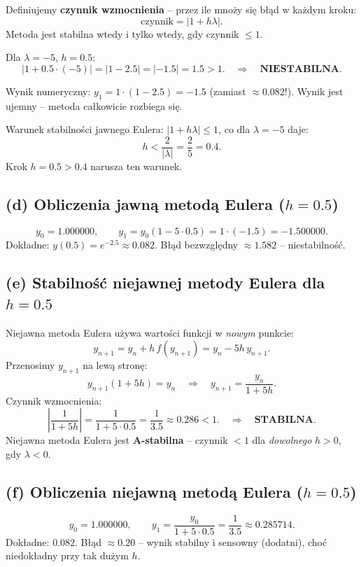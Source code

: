 \documentclass[a4paper,12pt]{article}
\begin{document}
Definiujemy \textbf{czynnik wzmocnienia} -- przez ile mnoży się błąd w każdym kroku:
\[
\text{czynnik} = |1 + h\lambda|.
\]
Metoda jest stabilna wtedy i tylko wtedy, gdy czynnik $\leq 1$.

Dla $\lambda = -5$, $h = 0.5$:
\[
|1 + 0.5 \cdot (-5)| = |1 - 2.5| = |-1.5| = 1.5 > 1. \quad \Rightarrow \quad \textbf{NIESTABILNA.}
\]

Wynik numeryczny: $y_1 = 1 \cdot (1-2.5) = -1.5$ (zamiast $\approx 0.082$!). Wynik jest ujemny -- metoda całkowicie rozbiega się.

Warunek stabilności jawnego Eulera: $|1+h\lambda| \leq 1$, co dla $\lambda = -5$ daje:
\[
h < \frac{2}{|\lambda|} = \frac{2}{5} = 0.4.
\]
Krok $h = 0.5 > 0.4$ narusza ten warunek.

\subsection*{(d) Obliczenia jawną metodą Eulera ($h=0.5$)}

\[
y_0 = 1.000000, \qquad
y_1 = y_0(1-5\cdot 0.5) = 1\cdot(-1.5) = \mathbf{-1.500000}.
\]
Dokładne: $y(0.5) = e^{-2.5} \approx 0.082$. Błąd bezwzględny $\approx 1.582$ -- niestabilność.

\subsection*{(e) Stabilność niejawnej metody Eulera dla $h=0.5$}

Niejawna metoda Eulera używa wartości funkcji w \emph{nowym} punkcie:
\[
y_{n+1} = y_n + h\,f(y_{n+1}) = y_n - 5h\,y_{n+1}.
\]
Przenosimy $y_{n+1}$ na lewą stronę:
\[
y_{n+1}(1 + 5h) = y_n \quad\Rightarrow\quad y_{n+1} = \frac{y_n}{1 + 5h}.
\]
Czynnik wzmocnienia:
\[
\left|\frac{1}{1+5h}\right| = \frac{1}{1+5\cdot 0.5} = \frac{1}{3.5} \approx 0.286 < 1. \quad\Rightarrow\quad \textbf{STABILNA.}
\]
Niejawna metoda Eulera jest \textbf{A-stabilna} -- czynnik $< 1$ dla \emph{dowolnego} $h>0$, gdy $\lambda < 0$.

\subsection*{(f) Obliczenia niejawną metodą Eulera ($h=0.5$)}

\[
y_0 = 1.000000, \qquad
y_1 = \frac{y_0}{1+5\cdot 0.5} = \frac{1}{3.5} \approx \mathbf{0.285714}.
\]
Dokładne: $0.082$. Błąd $\approx 0.20$ -- wynik stabilny i sensowny (dodatni), choć niedokładny przy tak dużym $h$.
\end{document}
